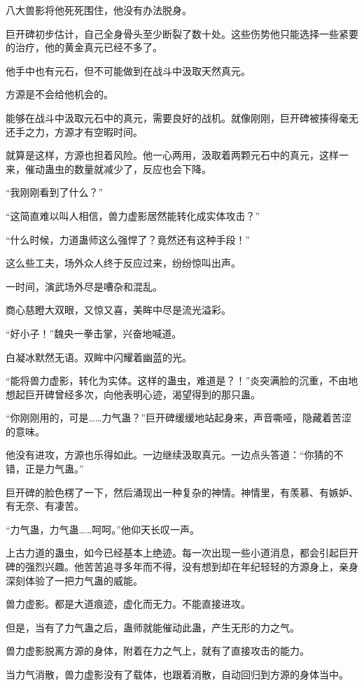 \begin{this_body}
八大兽影将他死死围住，他没有办法脱身。

巨开碑初步估计，自己全身骨头至少断裂了数十处。这些伤势他只能选择一些紧要的治疗，他的黄金真元已经不多了。

他手中也有元石，但不可能做到在战斗中汲取天然真元。

方源是不会给他机会的。

能够在战斗中汲取元石中的真元，需要良好的战机。就像刚刚，巨开碑被揍得毫无还手之力，方源才有空暇时间。

就算是这样，方源也担着风险。他一心两用，汲取着两颗元石中的真元，这样一来，催动蛊虫的数量就减少了，反应也会下降。

“我刚刚看到了什么？”

“这简直难以叫人相信，兽力虚影居然能转化成实体攻击？”

“什么时候，力道蛊师这么强悍了？竟然还有这种手段！”

这么些工夫，场外众人终于反应过来，纷纷惊叫出声。

一时间，演武场外尽是嘈杂和混乱。

商心慈瞪大双眼，又惊又喜，美眸中尽是流光溢彩。

“好小子！”魏央一拳击掌，兴奋地喊道。

白凝冰默然无语。双眸中闪耀着幽蓝的光。

“能将兽力虚影，转化为实体。这样的蛊虫，难道是？！”炎突满脸的沉重，不由地想起巨开碑曾经多次，向他表明心迹，渴望得到的那只蛊。

“你刚刚用的，可是……力气蛊？”巨开碑缓缓地站起身来，声音嘶哑，隐藏着苦涩的意味。

他没有进攻，方源也乐得如此。一边继续汲取真元。一边点头答道：“你猜的不错，正是力气蛊。”

巨开碑的脸色楞了一下，然后涌现出一种复杂的神情。神情里，有羡慕、有嫉妒、有无奈、有凄苦。

“力气蛊，力气蛊……呵呵。”他仰天长叹一声。

上古力道的蛊虫，如今已经基本上绝迹。每一次出现一些小道消息，都会引起巨开碑的强烈兴趣。他苦苦追寻多年而不得，没有想到却在年纪轻轻的方源身上，亲身深刻体验了一把力气蛊的威能。

兽力虚影。都是大道痕迹，虚化而无力。不能直接进攻。

但是，当有了力气蛊之后，蛊师就能催动此蛊，产生无形的力之气。

兽力虚影脱离方源的身体，附着在力之气上，就有了直接攻击的能力。

当力气消散，兽力虚影没有了载体，也跟着消散，自动回归到方源的身体当中。


\end{this_body}
